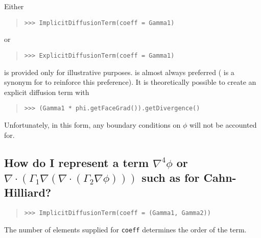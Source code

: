             Either
           \begin{quote}
\begin{verbatim}
>>> ImplicitDiffusionTerm(coeff = Gamma1)
\end{verbatim}
           \end{quote}
           or 
           \begin{quote}
\begin{verbatim}
>>> ExplicitDiffusionTerm(coeff = Gamma1)
\end{verbatim}
           \end{quote}
            is provided only for illustrative purposes.
            is almost always preferred ( is a synonym for  to reinforce this preference). It is
           theoretically possible to create an explicit diffusion term with
           \begin{quote}
\begin{verbatim}
>>> (Gamma1 * phi.getFaceGrad()).getDivergence()
\end{verbatim}
           \end{quote}
           Unfortunately, in this form, any boundary conditions on $\phi$
           will not be accounted for.

            
           
           \subsection{How do I represent a term $\nabla^4 \phi$ or
            $\nabla \cdot \left( \Gamma_1 \nabla \left(
            \nabla\cdot\left( 
            \Gamma_2 \nabla \phi\right) \right) \right) $ such as for 
            Cahn-Hilliard? \label{FAQ-higherOrderDiffusion}}
          \hspace*{\fill}
            
          \begin{quote}
\begin{verbatim}
>>> ImplicitDiffusionTerm(coeff = (Gamma1, Gamma2))
\end{verbatim}
          \end{quote}
          The number of elements supplied for \verb|coeff| determines the
          order of the term.

